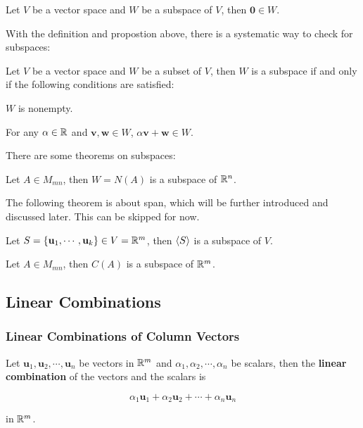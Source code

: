 \documentclass[a4paper,12pt]{article}
\begin{document}
\begin{pst}
  Let $V$ be a vector space and $W$ be a subspace of $V$, then $\mathbf{0}\in W$.
\end{pst}\n

With the definition and propostion above, there is a systematic way to check for subspaces:\n

\begin{thm}
  Let $V$ be a vector space and $W$ be a subset of $V$, then $W$ is a subspace if and only if the following conditions are satisfied:

  \begin{alist}
    \item $W$ is nonempty.
    \item For any $\alpha\in\mathbb{R}$ and $\mathbf{v},\mathbf{w}\in W$, $\alpha\mathbf{v}+\mathbf{w}\in W$.
  \end{alist}
\end{thm}\n

There are some theorems on subspaces:\n

\begin{thm}
  Let $A\in M_{mn}$, then $W=\mathit{N}(A)$ is a subspace of $\mathbb{R}^{n}$.
\end{thm}\n

The following theorem is about span, which will be further introduced and discussed later. This can be skipped for now.\n

\begin{thm}
  Let $S=\left\{ \mathbf{u}_{1},\cdots,\mathbf{u}_{k}\right\}\in V=\mathbb{R}^{m}$, then $\left\langle S\right\rangle$ is a subspace of $V$.
\end{thm}\n

\begin{crl}
  Let $A\in M_{mn}$, then $\mathit{C}(A)$ is a subspace of $\mathbb{R}^{m}$.
\end{crl}

\subsection{Linear Combinations}
\subsubsection{Linear Combinations of Column Vectors}
\begin{dft}
  Let $\mathbf{u}_{1},\mathbf{u}_{2},\cdots,\mathbf{u}_{n}$ be vectors in $\mathbb{R}^{m}$ and $\alpha_{1},\alpha_{2},\cdots,\alpha_{n}$ be scalars, then the \textbf{linear combination} of the vectors and the scalars is

  $$\alpha_{1}\mathbf{u}_{1}+\alpha_{2}\mathbf{u}_{2}+\cdots+\alpha_{n}\mathbf{u}_{n}$$\s

  in $\mathbb{R}^{m}$.
\end{dft}\n
\end{document}

